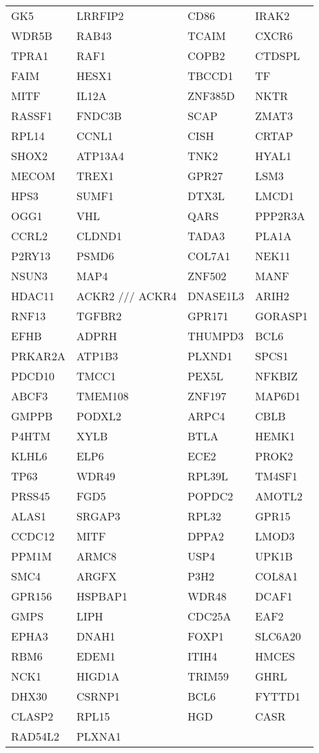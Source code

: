 {\begin{longtable}{llll}
GK5&LRRFIP2&CD86&IRAK2\tabularnewline
WDR5B&RAB43&TCAIM&CXCR6\tabularnewline
TPRA1&RAF1&COPB2&CTDSPL\tabularnewline
FAIM&HESX1&TBCCD1&TF\tabularnewline
MITF&IL12A&ZNF385D&NKTR\tabularnewline
RASSF1&FNDC3B&SCAP&ZMAT3\tabularnewline
RPL14&CCNL1&CISH&CRTAP\tabularnewline
SHOX2&ATP13A4&TNK2&HYAL1\tabularnewline
MECOM&TREX1&GPR27&LSM3\tabularnewline
HPS3&SUMF1&DTX3L&LMCD1\tabularnewline
OGG1&VHL&QARS&PPP2R3A\tabularnewline
CCRL2&CLDND1&TADA3&PLA1A\tabularnewline
P2RY13&PSMD6&COL7A1&NEK11\tabularnewline
NSUN3&MAP4&ZNF502&MANF\tabularnewline
HDAC11&ACKR2 /// ACKR4&DNASE1L3&ARIH2\tabularnewline
RNF13&TGFBR2&GPR171&GORASP1\tabularnewline
EFHB&ADPRH&THUMPD3&BCL6\tabularnewline
PRKAR2A&ATP1B3&PLXND1&SPCS1\tabularnewline
PDCD10&TMCC1&PEX5L&NFKBIZ\tabularnewline
ABCF3&TMEM108&ZNF197&MAP6D1\tabularnewline
GMPPB&PODXL2&ARPC4&CBLB\tabularnewline
P4HTM&XYLB&BTLA&HEMK1\tabularnewline
KLHL6&ELP6&ECE2&PROK2\tabularnewline
TP63&WDR49&RPL39L&TM4SF1\tabularnewline
PRSS45&FGD5&POPDC2&AMOTL2\tabularnewline
\newpage
ALAS1&SRGAP3&RPL32&GPR15\tabularnewline
CCDC12&MITF&DPPA2&LMOD3\tabularnewline
PPM1M&ARMC8&USP4&UPK1B\tabularnewline
SMC4&ARGFX&P3H2&COL8A1\tabularnewline
GPR156&HSPBAP1&WDR48&DCAF1\tabularnewline
GMPS&LIPH&CDC25A&EAF2\tabularnewline
EPHA3&DNAH1&FOXP1&SLC6A20\tabularnewline
RBM6&EDEM1&ITIH4&HMCES\tabularnewline
NCK1&HIGD1A&TRIM59&GHRL\tabularnewline
DHX30&CSRNP1&BCL6&FYTTD1\tabularnewline
CLASP2&RPL15&HGD&CASR\tabularnewline
RAD54L2&PLXNA1&&\tabularnewline
\bottomrule
\end{longtable}}
\addtocounter{table}{-1}
